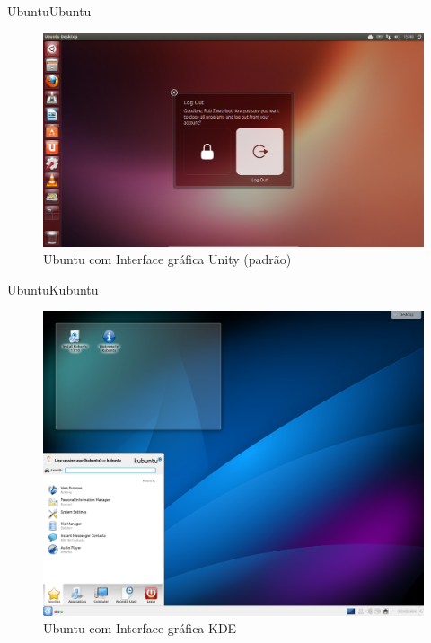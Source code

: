 \documentclass{beamer}
\begin{document}
\begin{frame}{Ubuntu}{Ubuntu}
 \begin{figure}[h!]
        \centering
        \includegraphics[scale=0.16]{unit.png}
        \caption{Ubuntu com Interface gráfica Unity (padrão)}
        \label{fig:Comando ls}
    \end{figure}
\end{frame}

\begin{frame}{Ubuntu}{Kubuntu}
 \begin{figure}[h!]
        \centering
        \includegraphics[scale=0.20]{Kubuntu.png}
        \caption{Ubuntu com Interface gráfica KDE}
        \label{fig:Comando ls}
    \end{figure}
\end{frame}
\end{document}
